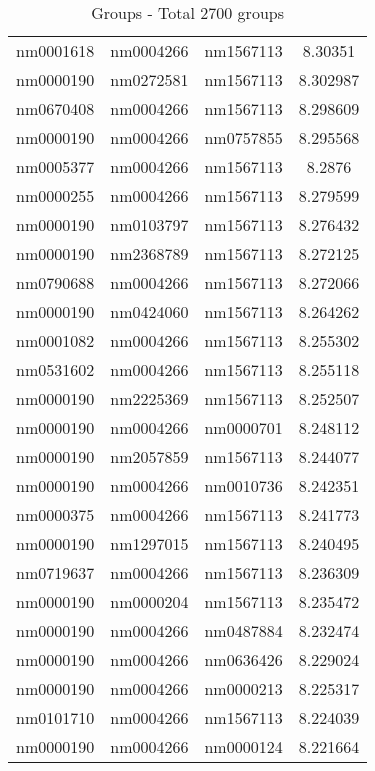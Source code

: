 \begin{table}[H]
\begin{tabular}{ |c|c|c|c| }
            nm0001618 & nm0004266 & nm1567113 & 8.30351 \\
            nm0000190 & nm0272581 & nm1567113 & 8.302987 \\
            nm0670408 & nm0004266 & nm1567113 & 8.298609 \\
            nm0000190 & nm0004266 & nm0757855 & 8.295568 \\
            nm0005377 & nm0004266 & nm1567113 & 8.2876 \\
            nm0000255 & nm0004266 & nm1567113 & 8.279599 \\
            nm0000190 & nm0103797 & nm1567113 & 8.276432 \\
            nm0000190 & nm2368789 & nm1567113 & 8.272125 \\
            nm0790688 & nm0004266 & nm1567113 & 8.272066 \\
            nm0000190 & nm0424060 & nm1567113 & 8.264262 \\
            nm0001082 & nm0004266 & nm1567113 & 8.255302 \\
            nm0531602 & nm0004266 & nm1567113 & 8.255118 \\
            nm0000190 & nm2225369 & nm1567113 & 8.252507 \\
            nm0000190 & nm0004266 & nm0000701 & 8.248112 \\
            nm0000190 & nm2057859 & nm1567113 & 8.244077 \\
            nm0000190 & nm0004266 & nm0010736 & 8.242351 \\
            nm0000375 & nm0004266 & nm1567113 & 8.241773 \\
            nm0000190 & nm1297015 & nm1567113 & 8.240495 \\
            nm0719637 & nm0004266 & nm1567113 & 8.236309 \\
            nm0000190 & nm0000204 & nm1567113 & 8.235472 \\
            nm0000190 & nm0004266 & nm0487884 & 8.232474 \\
            nm0000190 & nm0004266 & nm0636426 & 8.229024 \\
            nm0000190 & nm0004266 & nm0000213 & 8.225317 \\
            nm0101710 & nm0004266 & nm1567113 & 8.224039 \\
            nm0000190 & nm0004266 & nm0000124 & 8.221664 \\
            \hline
        \end{tabular}
    \caption{Groups - Total 2700 groups}
\end{table}

